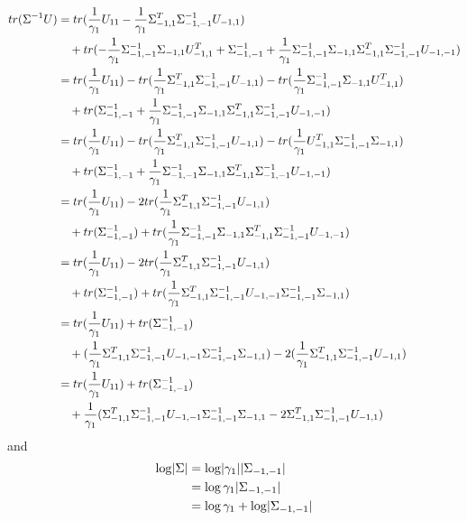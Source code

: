 \documentclass[12pt, leqno]{article}
\providecommand{\abs}[1]{\lvert#1\rvert}
\def\s{\ensuremath\Sigma}
\begin{document}
\begin{align*}
tr(\s^{-1}U) &= tr(\frac{1}{\gamma_1}U_{11}
               -\frac{1}{\gamma_1}\s_{-1,1}^T\s_{-1,-1}^{-1}U_{-1,1})
  \\
& \quad + tr( -
  \frac{1}{\gamma_1}\s_{-1,-1}^{-1}\s_{-1,1}U_{-1,1}^T+\s_{-1,-1}^{-1}
  +
  \frac{1}{\gamma_1}\s_{-1,-1}^{-1}\s_{-1,1}\s_{-1,1}^T\s_{-1,-1}^{-1}U_{-1,-1})
  \\
&= tr(\frac{1}{\gamma_1}U_{11})
               -tr(\frac{1}{\gamma_1}\s_{-1,1}^T\s_{-1,-1}^{-1}U_{-1,1})
- tr(
  \frac{1}{\gamma_1}\s_{-1,-1}^{-1}\s_{-1,1}U_{-1,1}^T)
   \\
& \quad  +
  tr(\s_{-1,-1}^{-1}+\frac{1}{\gamma_1}\s_{-1,-1}^{-1}\s_{-1,1}\s_{-1,1}^T\s_{-1,-1}^{-1}U_{-1,-1})
  \\
&= tr(\frac{1}{\gamma_1}U_{11})
               -tr(\frac{1}{\gamma_1}\s_{-1,1}^T\s_{-1,-1}^{-1}U_{-1,1})
- tr(
  \frac{1}{\gamma_1}U_{-1,1}^T\s_{-1,-1}^{-1}\s_{-1,1})
   \\
& \quad  +
  tr(\s_{-1,-1}^{-1}+\frac{1}{\gamma_1}\s_{-1,-1}^{-1}\s_{-1,1}\s_{-1,1}^T\s_{-1,-1}^{-1}U_{-1,-1})
  \\
&= tr(\frac{1}{\gamma_1}U_{11})
               -2tr(\frac{1}{\gamma_1}\s_{-1,1}^T\s_{-1,-1}^{-1}U_{-1,1})
   \\
& \quad  +
  tr(\s_{-1,-1}^{-1})+tr(\frac{1}{\gamma_1}\s_{-1,-1}^{-1}\s_{-1,1}\s_{-1,1}^T\s_{-1,-1}^{-1}U_{-1,-1})
  \\
&= tr(\frac{1}{\gamma_1}U_{11})
               -2tr(\frac{1}{\gamma_1}\s_{-1,1}^T\s_{-1,-1}^{-1}U_{-1,1})
   \\
& \quad  +
  tr(\s_{-1,-1}^{-1})+tr(\frac{1}{\gamma_1}\s_{-1,1}^T\s_{-1,-1}^{-1}U_{-1,-1}
  \s_{-1,-1}^{-1}\s_{-1,1}) \\
&= tr(\frac{1}{\gamma_1}U_{11}) +
  tr(\s_{-1,-1}^{-1}) \\
& \quad  +(\frac{1}{\gamma_1}\s_{-1,1}^T\s_{-1,-1}^{-1}U_{-1,-1}
  \s_{-1,-1}^{-1}\s_{-1,1})
  -2(\frac{1}{\gamma_1}\s_{-1,1}^T\s_{-1,-1}^{-1}U_{-1,1})\\
&= tr(\frac{1}{\gamma_1}U_{11}) +
  tr(\s_{-1,-1}^{-1}) \\
& \quad + \frac{1}{\gamma_1}(\s_{-1,1}^T\s_{-1,-1}^{-1}U_{-1,-1} \s_{-1,-1}^{-1}\s_{-1,1} -2\s_{-1,1}^T\s_{-1,-1}^{-1}U_{-1,1})
\end{align*}
and
\begin{align*}
\log \abs{\s} &= \log \abs{\gamma_1}\abs{\s_{-1,-1}} \\
&= \log \gamma_1 \abs{\s_{-1,-1}} \\
&= \log \gamma_1 + \log \abs{\s_{-1,-1}} 
\end{align*}
\end{document}
